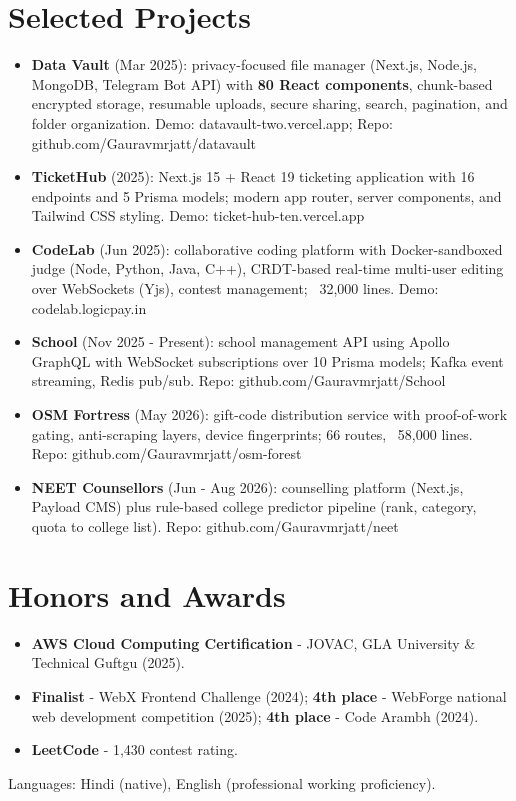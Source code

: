 \documentclass[11pt,a4paper,sans]{moderncv}
\begin{document}
\section{Selected Projects}
\vspace{1pt}
\begin{itemize}
    \item {\textbf{Data Vault} (Mar 2025): privacy-focused file manager (Next.js, Node.js, MongoDB, Telegram Bot API) with \textbf{80 React components}, chunk-based encrypted storage, resumable uploads, secure sharing, search, pagination, and folder organization. Demo: datavault-two.vercel.app; Repo: github.com/Gauravmrjatt/datavault}
    \item {\textbf{TicketHub} (2025): Next.js 15 + React 19 ticketing application with 16 endpoints and 5 Prisma models; modern app router, server components, and Tailwind CSS styling. Demo: ticket-hub-ten.vercel.app}
    \item {\textbf{CodeLab} (Jun 2025): collaborative coding platform with Docker-sandboxed judge (Node, Python, Java, C++), CRDT-based real-time multi-user editing over WebSockets (Yjs), contest management; ~32,000 lines. Demo: codelab.logicpay.in}
    \item {\textbf{School} (Nov 2025 - Present): school management API using Apollo GraphQL with WebSocket subscriptions over 10 Prisma models; Kafka event streaming, Redis pub/sub. Repo: github.com/Gauravmrjatt/School}
    \item {\textbf{OSM Fortress} (May 2026): gift-code distribution service with proof-of-work gating, anti-scraping layers, device fingerprints; 66 routes, ~58,000 lines. Repo: github.com/Gauravmrjatt/osm-forest}
    \item {\textbf{NEET Counsellors} (Jun - Aug 2026): counselling platform (Next.js, Payload CMS) plus rule-based college predictor pipeline (rank, category, quota to college list). Repo: github.com/Gauravmrjatt/neet}
\end{itemize}


\section{Honors and Awards}
\vspace{1pt}
\begin{itemize}
    \item {\textbf{AWS Cloud Computing Certification} - JOVAC, GLA University \& Technical Guftgu (2025).}
    \item {\textbf{Finalist} - WebX Frontend Challenge (2024); \textbf{4th place} - WebForge national web development competition (2025); \textbf{4th place} - Code Arambh (2024).}
    \item {\textbf{LeetCode} - 1,430 contest rating.}
\end{itemize}


\vspace{2pt}
\small{Languages: Hindi (native), English (professional working proficiency).}
\end{document}
